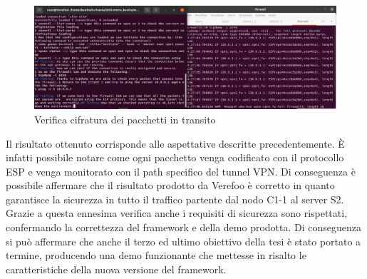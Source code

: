 \begin{figure}[H] 
    \centering
    \includegraphics[width=1\textwidth]{(4)Encryptedpacket_output.png} 
    \caption{Verifica cifratura dei pacchetti in transito}
    \label{fig:Verifica4}
\end{figure}

Il risultato ottenuto corrisponde alle aspettative descritte precedentemente. È infatti possibile notare come ogni pacchetto venga codificato con il protocollo ESP e venga monitorato con il path specifico del tunnel VPN.
Di conseguenza è possibile affermare che il risultato prodotto da Verefoo è corretto in quanto garantisce la sicurezza in tutto il traffico partente dal nodo C1-1 al server S2. Grazie a questa ennesima verifica anche i requisiti
di sicurezza sono rispettati, confermando la correttezza del framework e della demo prodotta. Di conseguenza si può affermare che anche il terzo ed ultimo obiettivo della tesi è stato portato a termine, producendo una demo funzionante che
mettesse in risalto le caratteristiche della nuova versione del framework.

